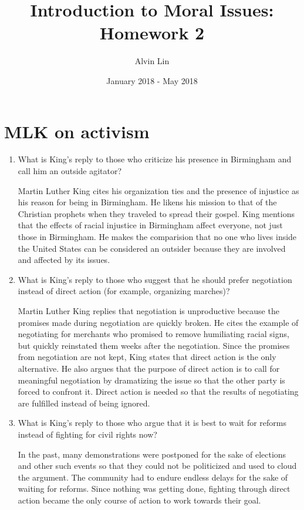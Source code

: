 \documentclass{article}
\title{Introduction to Moral Issues: Homework 2}
\author{Alvin Lin}
\date{January 2018 - May 2018}
\begin{document}
\maketitle

\section*{MLK on activism}
\begin{enumerate}
  \item What is King's reply to those who criticize his presence in Birmingham and call him an outside agitator?
  \par Martin Luther King cites his organization ties and the presence of injustice as his reason for being in Birmingham. He likens his mission to that of the Christian prophets when they traveled to spread their gospel. King mentions that the effects of racial injustice in Birmingham affect everyone, not just those in Birmingham. He makes the comparision that no one who lives inside the United States can be considered an outsider because they are involved and affected by its issues.
  \item What is King's reply to those who suggest that he should prefer negotiation instead of direct action (for example, organizing marches)?
  \par Martin Luther King replies that negotiation is unproductive because the promises made during negotiation are quickly broken. He cites the example of negotiating for merchants who promised to remove humiliating racial signs, but quickly reinstated them weeks after the negotiation. Since the promises from negotiation are not kept, King states that direct action is the only alternative. He also argues that the purpose of direct action is to call for meaningful negotiation by dramatizing the issue so that the other party is forced to confront it. Direct action is needed so that the results of negotiating are fulfilled instead of being ignored.
  \item What is King's reply to those who argue that it is best to wait for reforms instead of fighting for civil rights now?
  \par In the past, many demonstrations were postponed for the sake of elections and other such events so that they could not be politicized and used to cloud the argument. The community had to endure endless delays for the sake of waiting for reforms. Since nothing was getting done, fighting through direct action became the only course of action to work towards their goal.

\end{enumerate}
\end{document}
